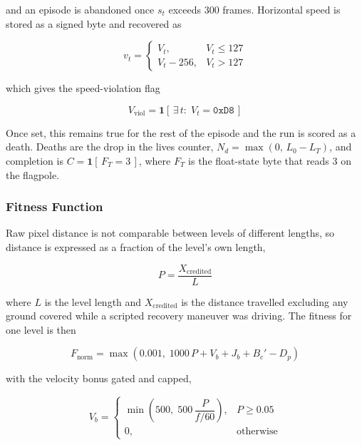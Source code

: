 \noindent
and an episode is abandoned once $s_t$ exceeds 300 frames. Horizontal speed is
stored as a signed byte and recovered as

\begin{equation}
    v_t =
    \begin{cases}
        V_t, & V_t \leq 127 \\
        V_t - 256, & V_t > 127
    \end{cases}
    \label{eq:speed}
\end{equation}

\noindent
which gives the speed-violation flag

\begin{equation}
    V_{\text{viol}} = \mathbf{1}\!\left[\, \exists\, t:\; V_t = \mathtt{0xD8} \,\right]
    \label{eq:violation}
\end{equation}

\noindent
Once set, this remains true for the rest of the episode and the run is scored
as a death. Deaths are the drop in the lives counter,
$N_{d} = \max(0,\, L_0 - L_T)$, and completion is
$C = \mathbf{1}[\,F_T = 3\,]$, where $F_T$ is the float-state byte that reads 3
on the flagpole.

\subsubsection{Fitness Function}

Raw pixel distance is not comparable between levels of different lengths, so
distance is expressed as a fraction of the level's own length,

\begin{equation}
    P = \frac{X_{\text{credited}}}{L}
    \label{eq:progress-fraction}
\end{equation}

\noindent
where $L$ is the level length and $X_{\text{credited}}$ is the distance
travelled excluding any ground covered while a scripted recovery maneuver was
driving. The fitness for one level is then

\begin{equation}
    F_{\text{norm}} = \max\!\left(0.001,\;
        1000\,P + V_{b} + J_{b} + B_{c}' - D_{p} \right)
    \label{eq:fitness-norm}
\end{equation}

\noindent
with the velocity bonus gated and capped,

\begin{equation}
    V_{b} =
    \begin{cases}
        \min\!\left(500,\; 500\,\dfrac{P}{f/60}\right), & P \geq 0.05 \\[6pt]
        0, & \text{otherwise}
    \end{cases}
    \label{eq:velocity-bonus}
\end{equation}

